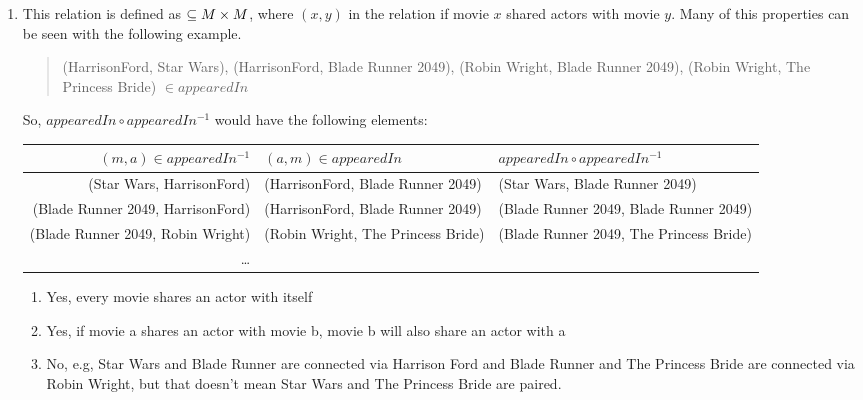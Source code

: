 \begin{questions}
\begin{solution}
\begin{enumerate}[label=(\alph*),itemsep=2pt,parsep=0pt,topsep=0pt,partopsep=0pt]
        \item This relation is defined as $\subseteq M \times M$, where $(x,y)$ in the relation if movie $x$ shared actors with movie $y$.  Many of this properties can be seen with the following example. 
            \begin{quote}
                (HarrisonFord, Star Wars), (HarrisonFord, Blade Runner 2049), (Robin Wright, Blade Runner 2049), (Robin Wright, The Princess Bride) $\in appearedIn$ 
            \end{quote}
        So, $appearedIn \circ appearedIn^{-1}$ would have the following elements: 
        
        \scriptsize
        \begin{center}
        \begin{tabular}{rll}
          $(m, a) \in appearedIn^{-1}$  & $ (a, m) \in appearedIn$  & $appearedIn \circ appearedIn^{-1}$ \\
          \hline 
            (Star Wars, HarrisonFord) & (HarrisonFord, Blade Runner 2049) & 
                (Star Wars, Blade Runner 2049) \\
            (Blade Runner 2049, HarrisonFord) & (HarrisonFord, Blade Runner 2049) & 
                (Blade Runner 2049,  Blade Runner 2049) \\
            (Blade Runner 2049, Robin Wright) & (Robin Wright, The Princess Bride) & 
                (Blade Runner 2049, The Princess Bride) \\
            \ldots & & 
        \end{tabular}
        \end{center}
        \normalsize

            \begin{enumerate}[label=(\roman*),itemsep=2pt,parsep=0pt,topsep=0pt,partopsep=0pt]
              \item Yes, every movie shares an actor with itself 
              \item Yes, if movie a shares an actor with movie b, movie b will also share an actor with a
              \item No, e.g, Star Wars and Blade Runner are connected via Harrison Ford and Blade Runner and The Princess Bride are connected via Robin Wright, but that doesn't mean Star Wars and The Princess Bride are paired.
            \end{enumerate}



\end{enumerate}
\end{solution}
\end{questions}
